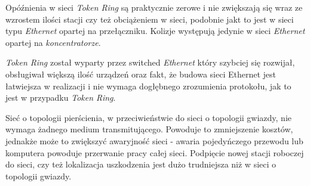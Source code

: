 \documentclass{article}
\begin{document}
Opóźnienia w sieci \emph{Token Ring} są praktycznie zerowe i nie zwiększają się wraz ze wzrostem ilości stacji czy też obciążeniem w sieci, podobnie jakt to jest w sieci typu \emph{Ethernet} opartej na przełączniku. Kolizje występują jedynie w sieci \emph{Ethernet} opartej na \emph{koncentratorze}.

\emph{Token Ring} został wyparty przez switched \emph{Ethernet} który szybciej się rozwijał, obsługiwał większą ilość urządzeń oraz fakt, że budowa sieci Ethernet jest łatwiejsza w realizacji i nie wymaga dogłębnego zrozumienia protokołu, jak to jest w przypadku \emph{Token Ring}.

Sieć o topologii pierścienia, w przeciwieństwie do sieci o topologii gwiazdy, nie wymaga żadnego medium transmitującego. Powoduje to zmniejszenie kosztów, jednakże może to zwiększyć awaryjność sieci - awaria pojedyńczego przewodu lub komputera powoduje przerwanie pracy całej sieci. Podpięcie nowej stacji roboczej do sieci, czy też lokalizacja uszkodzenia jest dużo trudniejsza niż w sieci o topologii gwiazdy.
\end{document}
